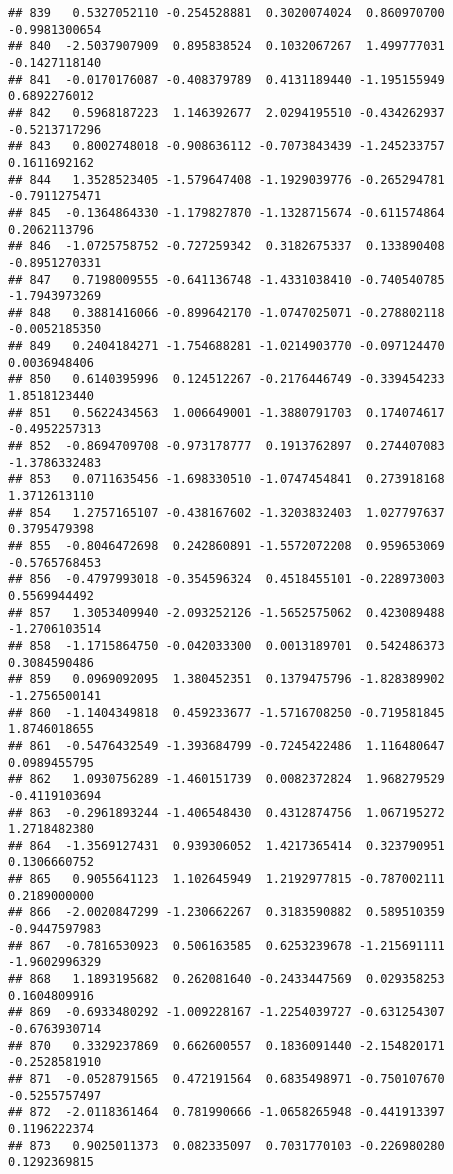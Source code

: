 \documentclass[
]{article}
\begin{document}
\begin{verbatim}
## 839   0.5327052110 -0.254528881  0.3020074024  0.860970700 -0.9981300654
## 840  -2.5037907909  0.895838524  0.1032067267  1.499777031 -0.1427118140
## 841  -0.0170176087 -0.408379789  0.4131189440 -1.195155949  0.6892276012
## 842   0.5968187223  1.146392677  2.0294195510 -0.434262937 -0.5213717296
## 843   0.8002748018 -0.908636112 -0.7073843439 -1.245233757  0.1611692162
## 844   1.3528523405 -1.579647408 -1.1929039776 -0.265294781 -0.7911275471
## 845  -0.1364864330 -1.179827870 -1.1328715674 -0.611574864  0.2062113796
## 846  -1.0725758752 -0.727259342  0.3182675337  0.133890408 -0.8951270331
## 847   0.7198009555 -0.641136748 -1.4331038410 -0.740540785 -1.7943973269
## 848   0.3881416066 -0.899642170 -1.0747025071 -0.278802118 -0.0052185350
## 849   0.2404184271 -1.754688281 -1.0214903770 -0.097124470  0.0036948406
## 850   0.6140395996  0.124512267 -0.2176446749 -0.339454233  1.8518123440
## 851   0.5622434563  1.006649001 -1.3880791703  0.174074617 -0.4952257313
## 852  -0.8694709708 -0.973178777  0.1913762897  0.274407083 -1.3786332483
## 853   0.0711635456 -1.698330510 -1.0747454841  0.273918168  1.3712613110
## 854   1.2757165107 -0.438167602 -1.3203832403  1.027797637  0.3795479398
## 855  -0.8046472698  0.242860891 -1.5572072208  0.959653069 -0.5765768453
## 856  -0.4797993018 -0.354596324  0.4518455101 -0.228973003  0.5569944492
## 857   1.3053409940 -2.093252126 -1.5652575062  0.423089488 -1.2706103514
## 858  -1.1715864750 -0.042033300  0.0013189701  0.542486373  0.3084590486
## 859   0.0969092095  1.380452351  0.1379475796 -1.828389902 -1.2756500141
## 860  -1.1404349818  0.459233677 -1.5716708250 -0.719581845  1.8746018655
## 861  -0.5476432549 -1.393684799 -0.7245422486  1.116480647  0.0989455795
## 862   1.0930756289 -1.460151739  0.0082372824  1.968279529 -0.4119103694
## 863  -0.2961893244 -1.406548430  0.4312874756  1.067195272  1.2718482380
## 864  -1.3569127431  0.939306052  1.4217365414  0.323790951  0.1306660752
## 865   0.9055641123  1.102645949  1.2192977815 -0.787002111  0.2189000000
## 866  -2.0020847299 -1.230662267  0.3183590882  0.589510359 -0.9447597983
## 867  -0.7816530923  0.506163585  0.6253239678 -1.215691111 -1.9602996329
## 868   1.1893195682  0.262081640 -0.2433447569  0.029358253  0.1604809916
## 869  -0.6933480292 -1.009228167 -1.2254039727 -0.631254307 -0.6763930714
## 870   0.3329237869  0.662600557  0.1836091440 -2.154820171 -0.2528581910
## 871  -0.0528791565  0.472191564  0.6835498971 -0.750107670 -0.5255757497
## 872  -2.0118361464  0.781990666 -1.0658265948 -0.441913397  0.1196222374
## 873   0.9025011373  0.082335097  0.7031770103 -0.226980280  0.1292369815

\end{verbatim}
\end{document}
